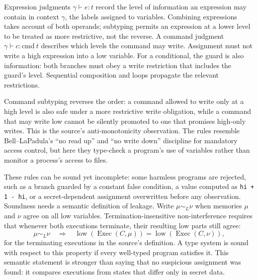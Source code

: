 \documentclass[11pt,a4paper]{article}
\numberwithin{figure}{section}
\begin{document}
Expression judgments $\gamma\vdash e:t$ record the level of information an expression may contain in context $\gamma$, the labels assigned to variables. Combining expressions takes account of both operands; subtyping permits an expression at a lower level to be treated as more restrictive, not the reverse. A command judgment $\gamma\vdash c:\mathrm{cmd}\ t$ describes which levels the command may write. Assignment must not write a high expression into a low variable. For a conditional, the guard is also information: both branches must obey a write restriction that includes the guard's level. Sequential composition and loops propagate the relevant restrictions.

Command subtyping reverses the order: a command allowed to write only at a high level is also safe under a more restrictive write obligation, while a command that may write low cannot be silently promoted to one that promises high-only writes. This is the source's anti-monotonicity observation. The rules resemble Bell--LaPadula's ``no read up'' and ``no write down'' discipline for mandatory access control, but here they type-check a program's use of variables rather than monitor a process's access to files.

These rules can be sound yet incomplete: some harmless programs are rejected, such as a branch guarded by a constant false condition, a value computed as \texttt{hi + 1 - hi}, or a secret-dependent assignment overwritten before any observation. Soundness needs a semantic definition of leakage. Write $\mu\sim_L\nu$ when memories $\mu$ and $\nu$ agree on all low variables. Termination-insensitive non-interference requires that whenever both executions terminate, their resulting low parts still agree:
\[
\mu\sim_L\nu\quad\Longrightarrow\quad
\operatorname{low}(\operatorname{Exec}(C,\mu))=
\operatorname{low}(\operatorname{Exec}(C,\nu)),
\]
for the terminating executions in the source's definition. A type system is sound with respect to this property if every well-typed program satisfies it. This semantic statement is stronger than saying that no suspicious assignment was found: it compares executions from states that differ only in secret data.

\begin{center}\end{center}
\end{document}
